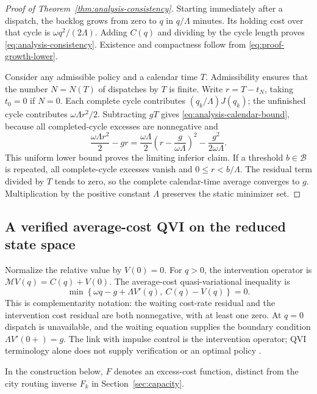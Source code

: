 \begin{proof}[Proof of Theorem~\ref{thm:analysis-consistency}]
Starting immediately after a dispatch, the backlog grows from zero to $q$
in $q/\Lambda$ minutes. Its holding cost over that cycle is
$\omega q^2/(2\Lambda)$. Adding $C(q)$ and dividing by the cycle length
proves \eqref{eq:analysis-consistency}. Existence and compactness follow
from \eqref{eq:proof-growth-lower}.

Consider any admissible policy and a calendar time $T$. Admissibility
ensures that the number $N=N(T)$ of dispatches by $T$ is finite. Write
$r=T-t_N$, taking $t_0=0$ if $N=0$. Each complete cycle contributes
$(q_k/\Lambda)J(q_k)$; the unfinished cycle contributes
$\omega\Lambda r^2/2$. Subtracting $gT$ gives
\eqref{eq:analysis-calendar-bound}, because all completed-cycle excesses
are nonnegative and
\[
 \frac{\omega\Lambda r^2}2-gr
 =\frac{\omega\Lambda}2
        \left(r-\frac g{\omega\Lambda}\right)^2
       -\frac{g^2}{2\omega\Lambda}.
\]
This uniform lower bound proves the limiting inferior claim. If a threshold
$b\in\mathcal B$ is repeated, all complete-cycle excesses vanish and
$0\le r<b/\Lambda$. The residual term divided by $T$ tends to zero, so
the complete calendar-time average converges to $g$. Multiplication by
the positive constant $\Lambda$ preserves the static minimizer set.
\end{proof}

\subsection{A verified average-cost QVI on the reduced state space}
\label{subsec:qvi}

Normalize the relative value by $V(0)=0$. For $q>0$, the intervention
operator is $\mathcal MV(q)=C(q)+V(0)$. The average-cost
quasi-variational inequality is
\begin{equation}
 \min\left\{\omega q-g+\Lambda V'(q),\ C(q)-V(q)\right\}=0.
 \label{eq:analysis-qvi}
\end{equation}
This is complementarity notation: the waiting cost-rate residual and
the intervention cost residual are both nonnegative, with at least one
zero. At $q=0$
dispatch is unavailable, and the waiting equation supplies the boundary
condition $\Lambda V'(0+)=g$. The link with impulse control is the
intervention operator; QVI terminology alone does not supply verification
or an optimal policy \cite{LionsPerthame1986,Belak2017}.

In the construction below, $F$ denotes an excess-cost function, distinct
from the city routing inverse $F_k$ in Section~\ref{sec:capacity}.

